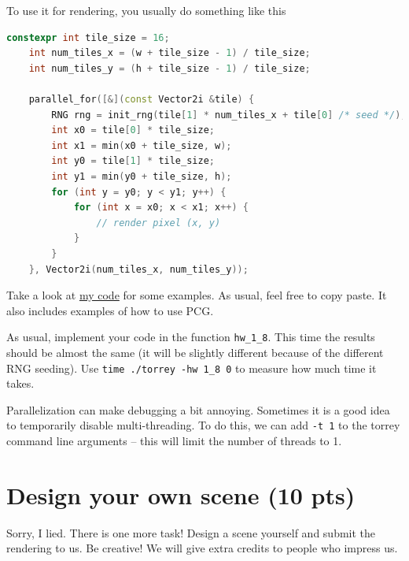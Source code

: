 To use it for rendering, you usually do something like this
\begin{lstlisting}[language=C++]
    constexpr int tile_size = 16;
    int num_tiles_x = (w + tile_size - 1) / tile_size;
    int num_tiles_y = (h + tile_size - 1) / tile_size;

    parallel_for([&](const Vector2i &tile) {
        RNG rng = init_rng(tile[1] * num_tiles_x + tile[0] /* seed */);
        int x0 = tile[0] * tile_size;
        int x1 = min(x0 + tile_size, w);
        int y0 = tile[1] * tile_size;
        int y1 = min(y0 + tile_size, h);
        for (int y = y0; y < y1; y++) {
            for (int x = x0; x < x1; x++) {
                // render pixel (x, y)
            }
        }
    }, Vector2i(num_tiles_x, num_tiles_y));
\end{lstlisting}

Take a look at \href{https://github.com/BachiLi/lajolla_public/tree/main/src/render.cpp}{my code} for some examples. As usual, feel free to copy paste. It also includes examples of how to use PCG.

As usual, implement your code in the function \lstinline{hw_1_8}. This time the results should be almost the same (it will be slightly different because of the different RNG seeding). Use \lstinline{time ./torrey -hw 1_8 0} to measure how much time it takes.

Parallelization can make debugging a bit annoying. Sometimes it is a good idea to temporarily disable multi-threading. To do this, we can add \lstinline{-t 1} to the torrey command line arguments -- this will limit the number of threads to 1.

\section{Design your own scene (10 pts)}
\label{sec:design_your_own}

Sorry, I lied. There is one more task! Design a scene yourself and submit the rendering to us. Be creative! We will give extra credits to people who impress us.

